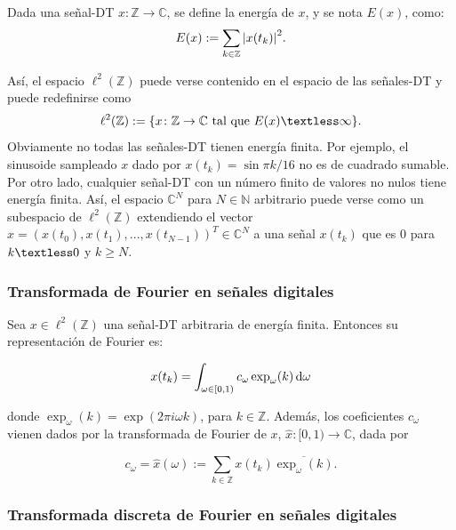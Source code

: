\documentclass{article}
\begin{document}
\begin{definition}
    Dada una señal-DT $x:\mathbb{Z}\rightarrow\mathbb{C}$, se define la energía de $x$, y se nota $E(x)$, como:
    \begin{equation*}
        E(x):=\sum_{k\in\mathbb{Z}}\abs{x(t_k)}^2.
    \end{equation*}
\end{definition}
Así, el espacio $\ell^2(\mathbb{Z})$ puede verse contenido en el espacio de las señales-DT y puede redefinirse como
\begin{equation*}
    \ell^2(\mathbb{Z}):=\{x\colon \mathbb{Z}\rightarrow\mathbb{C} \text{ tal que } E(x)\textless\infty\}.
\end{equation*}
Obviamente no todas las señales-DT tienen energía finita. Por ejemplo, el sinusoide sampleado $x$ dado por $x(t_k)=\sin{\pi k/16}$ no es de cuadrado sumable. Por otro lado, cualquier señal-DT con un número finito de valores no nulos tiene energía finita. Así, el espacio $\mathbb{C}^N$ para $N\in\mathbb{N}$ arbitrario puede verse como un subespacio de $\ell^2(\mathbb{Z})$ extendiendo el vector $x=(x(t_0),x(t_1),...,x(t_{N-1}))^T\in\mathbb{C}^N$ a una señal $x(t_k)$ que es 0 para $k\textless0$ y $k\geq{N}$.

\subsubsection{Transformada de Fourier en señales digitales}
Sea $x\in\ell^2(\mathbb{Z})$ una señal-DT arbitraria de energía finita. Entonces su representación de Fourier es:

\begin{equation}
    x(t_k)=\int_{\omega\in[0,1)}c_\omega\exp_\omega(k)\,\mathrm{d} \omega
\end{equation}

donde $\exp_\omega(k)=\exp(2\pi i\omega k)$, para $k\in\mathbb{Z}$. Además, los coeficientes $c_\omega$ vienen dados por la transformada de Fourier de $x$, $\hat{x} \colon [0,1)\rightarrow\mathbb{C}$, dada por

\begin{equation}\label{eq:FT-DT}
    c_\omega=\hat{x}(\omega):=\sum_{k\in\mathbb{Z}}x(t_k)\overline{\exp_\omega(k)}.
\end{equation}

\subsubsection{Transformada discreta de Fourier en señales digitales}
\end{document}
